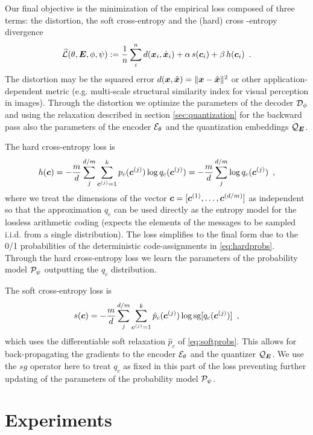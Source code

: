 \documentclass{article} %
\newcommand{\Lsh}{\widehat{\Ls}}
\newcommand{\pc}{p_c}
\newcommand{\qc}{q_c}
\newcommand{\gEt}{\gE_\theta}
\newcommand{\gQE}{\gQ_\mE}
\newcommand{\gDp}{\gD_\phi}
\newcommand{\vxh}{\hat{\vx}}
\newcommand{\gPp}{\gP_{\psi}}
\begin{document}
Our final objective is the minimization of the empirical loss composed of three terms: the distortion, the soft cross-entropy and the (hard) cross -entropy divergence
\begin{align}\label{eq:loss_final}
\Lsh(\theta, \mE, \phi, \psi) := \frac{1}{n}\sum_i^n d(\vx_i, \vxh_i) + \alpha \, s(\vc_i) + \beta \, h(\vc_i) \enspace .
\end{align}
The distortion may be the squared error $d(\vx, \vxh) = \Vert \vx - \vxh \Vert^2$ or other application-dependent metric (e.g. multi-scale structural similarity index for visual perception in images).
Through the distortion we optimize the parameters of the decoder $\gDp$ and using the relaxation described in section \ref{sec:quantization} for the backward pass also the parameters of the encoder $\gEt$ and the quantization embeddings $\gQE$.

The hard cross-entropy loss is
\begin{align}
h(\vc) = - \frac{m}{d} \sum_j^{d/m} \sum_{\vc^{(j)} = 1}^k \pc(\vc^{(j)}) \log \qc(\vc^{(j)})
= - \frac{m}{d} \sum_j^{d/m} \log \qc(\vc^{(j)}) \enspace ,
\end{align}
where we treat the dimensions of the vector ${\bm{c}} = [{\bm{c}}^{(1)}, \ldots, {\bm{c}}^{(d/m)}]$ as independent so that the approximation $\qc$ can be used directly as the entropy model for the lossless arithmetic coding (expects the elements of the messages to be sampled i.i.d. from a single distribution).
The loss simplifies to the final form due to the 0/1 probabilities of the deterministic code-assignments in \eqref{eq:hardprobs}.
Through the hard cross-entropy loss we learn the parameters of the probability model $\gPp$ outputting the $\qc$ distribution.

The soft cross-entropy loss is
\begin{align}
s(\vc) = - \frac{m}{d} \sum_j^{d/m} \sum_{\vc^{(j)} = 1}^k \hat{p}_c(\vc^{(j)}) \log \textrm{sg}[\qc(\vc^{(j)})] \enspace ,
\end{align}
which uses the differentiable soft relaxation $\hat{p}_c$ of \eqref{eq:softprobs}. 
This allows for back-propagating the gradients to the encoder $\gEt$ and the quantizer $\gQE$. 
We use the $sg$ operator here to treat $\qc$ as fixed in this part of the loss preventing further updating of the parameters of the probability model $\gPp$.


\section{Experiments}
\end{document}
